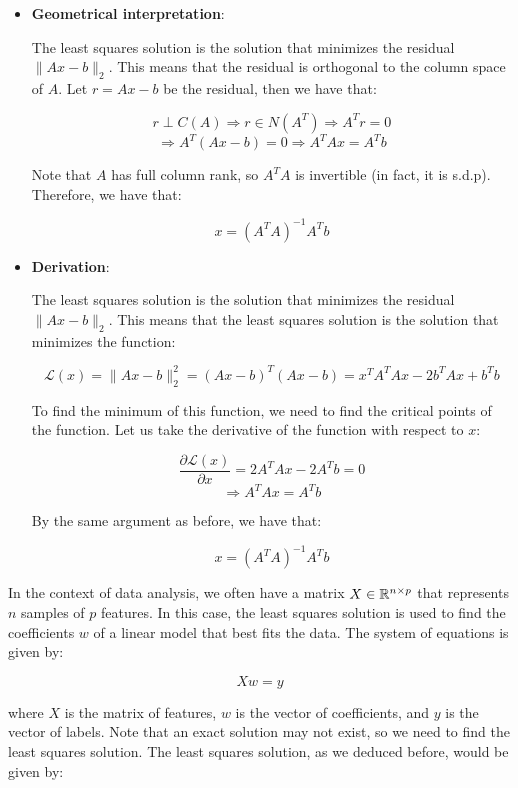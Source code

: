 \begin{itemize}
    \item \textbf{Geometrical interpretation}:
    
    The least squares solution is the solution that minimizes the residual $\|A x - b\|_2$. This means that the residual
is orthogonal to the column space of $A$. Let $r = A x - b$ be the residual, then we have that:

$$r \perp C(A) \Rightarrow r \in N(A^T) \Rightarrow A^T r = 0$$
$$\Rightarrow A^T (A x - b) = 0 \Rightarrow A^T A x = A^T b$$

Note that $A$ has full column rank, so $A^T A$ is invertible (in fact, it is s.d.p). Therefore, we have that:

$$x = (A^T A)^{-1} A^T b$$

    \item \textbf{Derivation}:
    
    The least squares solution is the solution that minimizes the residual $\|A x - b\|_2$. This means that the least squares
    solution is the solution that minimizes the function:
    
    $$\mathcal{L}(x) = \|A x - b\|_2^2 = (A x - b)^T (A x - b) = x^T A^T A x - 2 b^T A x + b^T b$$
    
    To find the minimum of this function, we need to find the critical points of the function. Let us take the derivative
    of the function with respect to $x$:
    
    $$\frac{\partial \mathcal{L}(x)}{\partial x} = 2 A^T A x - 2 A^T b = 0$$
    $$\Rightarrow A^T A x = A^T b$$
    
    By the same argument as before, we have that:
    
    $$x = (A^T A)^{-1} A^T b$$

\end{itemize}

In the context of data analysis, we often have a matrix $X \in \mathbb{R}^{n \times p}$ that represents $n$ samples of $p$ features.
In this case, the least squares solution is used to find the coefficients $w$ of a linear model that best fits the data. The
system of equations is given by:

\begin{equation}
    X w = y
\end{equation}

where $X$ is the matrix of features, $w$ is the vector of coefficients, and $y$ is the vector of labels. Note that an exact 
solution may not exist, so we need to find the least squares solution. The least squares solution, as we deduced before,
would be given by:

